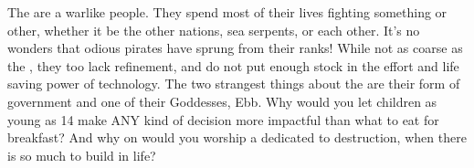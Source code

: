 \documentclass[blue]{GL2020}
\begin{document}
The \pShippies{} are a warlike people.  They spend most of their lives fighting something or other, whether it be the other nations, sea serpents, or each other.  It's no wonders that odious pirates have sprung from their ranks!  While not as coarse as the \pFarmers{}, they too lack refinement, and do not put enough stock in the effort and life saving power of technology.   The two strangest things about the \pShippies{} are their form of government and one of their Goddesses, Ebb.  Why would you let children as young as 14 make ANY kind of decision more impactful than what to eat for breakfast?  And why on \pEarth{} would you worship a \cEbb{\Deity} dedicated to destruction, when there is so much to build in life?
					
\end{document}
